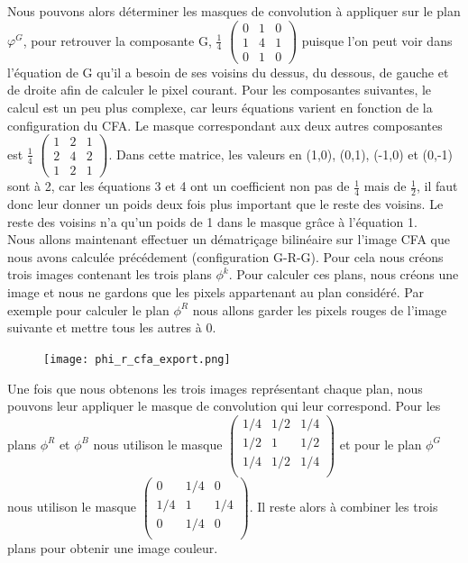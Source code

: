 \documentclass[a4paper,11pt]{article}
\begin{document}
  Nous pouvons alors déterminer les masques de convolution à appliquer sur le plan $\varphi^G$,
  pour retrouver la composante G, $\frac{1}{4}$
  $\begin{pmatrix}
   0 & 1 & 0\\
   1 & 4 & 1\\
   0 & 1 & 0
  \end{pmatrix}$
  puisque l'on peut voir dans l'équation de G qu'il a besoin de ses voisins du dessus, du dessous,
  de gauche et de droite afin de calculer le pixel courant. Pour les composantes suivantes, le calcul
  est un peu plus complexe, car leurs équations varient en fonction de la configuration du CFA. Le masque
  correspondant aux deux autres composantes est $\frac{1}{4}$
  $\begin{pmatrix}
   1 & 2 & 1\\
   2 & 4 & 2\\
   1 & 2 & 1
  \end{pmatrix}$. Dans cette matrice, les valeurs en (1,0), (0,1), (-1,0) et (0,-1) sont à 2, car 
  les équations 3 et 4 ont un coefficient non pas de $\frac{1}{4}$ mais de $\frac{1}{2}$, il faut
  donc leur donner un poids deux fois plus important que le reste des voisins. Le reste des voisins n'a 
  qu'un poids de 1 dans le masque grâce à l'équation 1.\\
  
  Nous allons maintenant effectuer un dématriçage bilinéaire sur l'image CFA que nous avons calculée
  précédement (configuration G-R-G). Pour cela nous créons trois images contenant les trois plans $\phi^k$.
  Pour calculer ces plans, nous créons une image et nous ne gardons que les pixels appartenant au plan considéré.
  Par exemple pour calculer le plan $\phi^R$ nous allons garder les pixels rouges de l'image suivante et mettre tous 
  les autres à 0.
  
  \begin{figure}[H]
  \center
   \texttt{[image: phi\_r\_cfa\_export.png]}
  \end{figure}

  Une fois que nous obtenons les trois images représentant chaque plan, nous pouvons leur appliquer le masque de
  convolution qui leur correspond. Pour les plans $\phi^R$ et $\phi^B$ nous utilison le masque 
  $\begin{pmatrix}
    1/4 & 1/2 & 1/4\\
    1/2 & 1 & 1/2\\
    1/4 & 1/2 & 1/4\\
   \end{pmatrix}$ et pour le plan $\phi^G$ nous utilison le masque 
   $\begin{pmatrix}
    0 & 1/4 & 0\\
    1/4 & 1 & 1/4\\
    0 & 1/4 & 0\\
   \end{pmatrix}$.
   Il reste alors à combiner les trois plans pour obtenir une image couleur.\\
   
\end{document}
